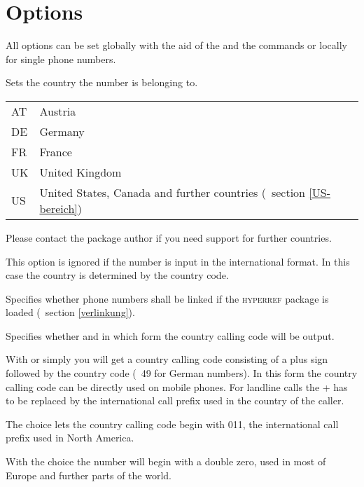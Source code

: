 \documentclass[numbers=noenddot]{scrreprt}
\newcommand*\Paket[1]{\textsc{#1}}
\newcommand*\UeberschriftOptionen[1]{\section{Options}\label{optionen-#1}}
\newcommand*\vglAbschnitt[1]{(\cf\ section \ref{#1})}
\begin{document}
\UeberschriftOptionen{allgemein}
All options can be set globally with the aid of the  and the  commands or locally for single phone numbers.
\begin{Befehlsliste}
Sets the country the number is belonging to.
\begin{center}
\begin{tabular}{>{\ttfamily}ll}
AT & Austria \\
DE & Germany \\
FR & France \\
UK & United Kingdom \\
US & United States, Canada and further countries
\vglAbschnitt{US-bereich}
\end{tabular}
\end{center}
Please contact the package author if you need support for further countries.

This option is ignored if the number is input in the international format. In this case the country is determined by the country code.

Specifies whether phone numbers shall be linked if the \Paket{hyperref} package is loaded
\vglAbschnitt{verlinkung}.

Specifies whether and in which form the country calling code will be output.

With  or simply  you will get a country calling code consisting of a plus sign followed by the country code (\eg\ 49 for German numbers). In this form the country calling code can be directly used on mobile phones. For landline calls the + has to be replaced by the international call prefix used in the country of the caller.
\begin{sidebyside}
\end{sidebyside}
The choice  lets the country calling code begin with 011, the international call prefix used in North America.
\begin{sidebyside}
\end{sidebyside}
With the choice  the number will begin with a double zero, used in most of Europe and further parts of the world.
\begin{sidebyside}
\end{sidebyside}


\end{Befehlsliste}
\end{document}
